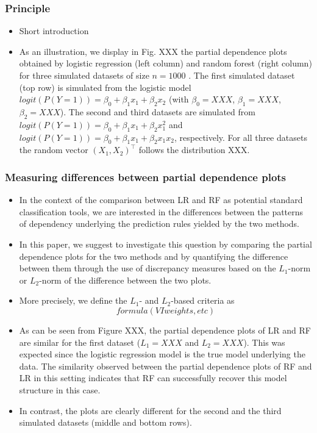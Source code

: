 \documentclass[12pt]{article}
\begin{document}
\subsubsection{Principle}
\begin{itemize}
\item Short introduction
\item As an illustration, we display in Fig. XXX the partial dependence plots obtained by logistic regression  (left column) and random forest (right column) for three simulated datasets of size $n=1000$ . The first simulated dataset (top row) is simulated from the logistic model $logit(P(Y=1))=\beta_0+\beta_1x_1+\beta_2x_2$ (with $\beta_0=XXX$, $\beta_1=XXX$, $\beta_2=XXX$). The second and third datasets are simulated from $logit(P(Y=1))=\beta_0+\beta_1x_1+\beta_2x_1^2$ and $logit(P(Y=1))=\beta_0+\beta_1x_1+\beta_2x_1x_2$, respectively. For all three datasets the random vector $(X_1,X_2)^\top$ follows the distribution XXX.
\end{itemize}


\subsubsection{Measuring differences between partial dependence plots}
\begin{itemize}
\item In the context of the comparison between LR and RF as potential standard classification tools, we are interested in the differences between the patterns of dependency underlying the prediction rules yielded by the two methods.
\item In this paper, we suggest to investigate this question by comparing the partial dependence plots for the two methods and by quantifying the difference between them through the use of discrepancy measures based on the $L_1$-norm or $L_2$-norm of the difference between the two plots.
\item More precisely, we define the $L_1$- and $L_2$-based criteria as
\[
formula (VI weights, etc)
\]

\item As can be seen from Figure XXX, the partial dependence plots of LR and RF are similar for the first dataset ($L_1=XXX$ and $L_2=XXX$). This was expected since the logistic regression model is the true model underlying the data. The similarity observed between the partial dependence plots of RF and LR in this setting indicates that RF can successfully recover this model structure in this case.
\item In contrast, the plots are clearly different for the second and the third simulated datasets (middle and bottom rows).
\end{itemize}
\end{document}
